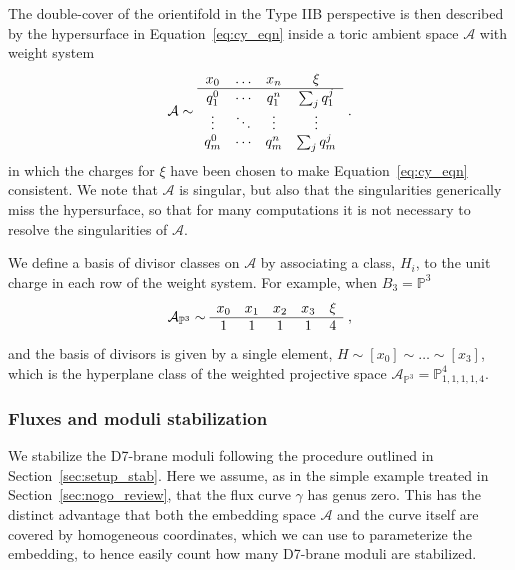 \documentclass[a4paper,12pt]{article}
\numberwithin{equation}{section}
\newcommand{\mc}{\mathcal}
\newcommand{\mbb}{\mathbb}
\newcommand{\be}{\begin{equation}}
\newcommand{\ee}{\end{equation}}
\newcommand{\fthb}{B_3}				%
\newcommand{\as}{\mc{A}}				%
\newcommand{\crv}{\gamma}			%
\begin{document}
The double-cover of the orientifold in the Type IIB perspective is then described by the hypersurface in Equation~\eqref{eq:cy_eqn} inside a toric ambient space $\as$ with weight system
\be
\as \sim
\begin{array}{c c c c}
x_0 & \ldots & x_n & \xi \\
\hline
q_1^0 & \cdots & q_1^n & \sum_j q_1^j\\
\vdots & \ddots & \vdots & \vdots \\
q_m^0 & \cdots & q_m^n & \sum_j q_m^j
\end{array} ~.
\ee
in which the charges for $\xi$ have been chosen to make Equation~\eqref{eq:cy_eqn} consistent. We note that $\as$ is singular, but also that the singularities generically miss the hypersurface, so that for many computations it is not necessary to resolve the singularities of $\as$.

We define a basis of divisor classes on $\as$ by associating a class, $H_i$, to the unit charge in each row of the weight system. For example, when $\fthb = \mbb{P}^3$
\be
\as _{\mbb{P}^3} \sim
\begin{array}{c c c c c c}
x_0 & x_1& x_2 & x_3 & \xi \\
\hline
1 & 1 & 1 & 1 & 4
\end{array} ~,
\ee
and the basis of divisors is given by a single element, $H \sim [x_0] \sim \ldots \sim [x_3]$, which is the hyperplane class of the weighted projective space $\as_{\mbb{P}^3} = \mbb{P}^4_{1,1,1,1,4}$.

\subsubsection*{Fluxes and moduli stabilization}

We stabilize the D7-brane moduli following the procedure outlined in Section~\ref{sec:setup_stab}. Here we assume, as in the simple example treated in Section~\ref{sec:nogo_review}, that the flux curve $\crv$ has genus zero. This has the distinct advantage that both the embedding space $\as$ and the curve itself are covered by homogeneous coordinates, which we can use to parameterize the embedding, to hence easily count how many D7-brane moduli are stabilized.

\medskip
\end{document}
